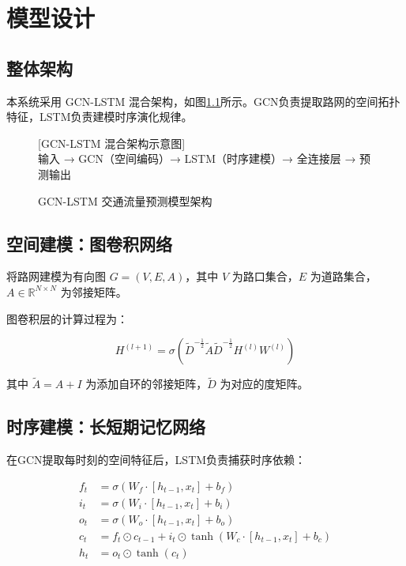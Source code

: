 \documentclass{harryopo-report}
\begin{document}
\chapter{模型设计}

\section{整体架构}

本系统采用 GCN-LSTM 混合架构，如图\ref{fig:architecture}所示。GCN负责提取路网的空间拓扑特征，LSTM负责建模时序演化规律。

\begin{figure}[htbp]
    \centering
    \colorbox{gray!10}{\parbox{0.85\textwidth}{\centering\vspace{2cm}
        {\large\color{gray} [GCN-LSTM 混合架构示意图]}\\[0.5cm]
        \small 输入 → GCN（空间编码）→ LSTM（时序建模）→ 全连接层 → 预测输出
    \vspace{2cm}}}
    \caption{GCN-LSTM 交通流量预测模型架构}
    \label{fig:architecture}
\end{figure}

\section{空间建模：图卷积网络}

将路网建模为有向图 $G = (V, E, A)$，其中 $V$ 为路口集合，$E$ 为道路集合，$A \in \mathbb{R}^{N \times N}$ 为邻接矩阵。

图卷积层的计算过程为：

\begin{equation}
H^{(l+1)} = \sigma\left(\tilde{D}^{-\frac{1}{2}} \tilde{A} \tilde{D}^{-\frac{1}{2}} H^{(l)} W^{(l)}\right)
\label{eq:gcn}
\end{equation}

其中 $\tilde{A} = A + I$ 为添加自环的邻接矩阵，$\tilde{D}$ 为对应的度矩阵。

\section{时序建模：长短期记忆网络}

在GCN提取每时刻的空间特征后，LSTM负责捕获时序依赖：

\begin{align}
f_t &= \sigma(W_f \cdot [h_{t-1}, x_t] + b_f) \label{eq:lstm_f} \\
i_t &= \sigma(W_i \cdot [h_{t-1}, x_t] + b_i) \label{eq:lstm_i} \\
o_t &= \sigma(W_o \cdot [h_{t-1}, x_t] + b_o) \label{eq:lstm_o} \\
c_t &= f_t \odot c_{t-1} + i_t \odot \tanh(W_c \cdot [h_{t-1}, x_t] + b_c) \label{eq:lstm_c} \\
h_t &= o_t \odot \tanh(c_t) \label{eq:lstm_h}
\end{align}
\end{document}

